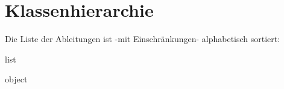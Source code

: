 \section{Klassenhierarchie}
Die Liste der Ableitungen ist -\/mit Einschränkungen-\/ alphabetisch sortiert\+:\begin{DoxyCompactList}
\item list\begin{DoxyCompactList}
\item {}
\end{DoxyCompactList}
\item object\begin{DoxyCompactList}
\item {}
\end{DoxyCompactList}
\item {}
\end{DoxyCompactList}
